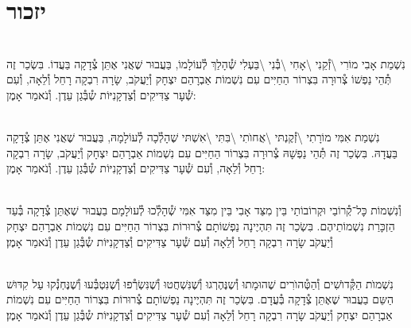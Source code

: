 \documentclass[twoside, openany, parskip=half, 11pt]{book}
\begin{document}
\vfill
{}


\sepline



\chapter[יזכור]{ יזכור }

 

\\
נִשְׁמַת אָבִי מוֹרִי \textbackslash זְ֯קֵנִי \textbackslash אָחִי \textbackslash בְּ֯נִי \textbackslash בַּעְלִי  שְׁ֯הָלַךְ לְ֯עוֹלָמוֹ, בַּעֲבוּר שֶׁאֲנִי אֶתֵּן צְ֯דָקָה בַּעֲדוֹ. בִּשְׂכַר זֶה תְּ֯הֵי נַפְשׁוֹ צְ֯רוּרָה בִּצְרוֹר הַחַיִּים עִם נִשְׁמוֹת אַבְרָהַם יִצְחָק וְ֯יַעֲקֹב, שָׂרָה רִבְקָה רָחֵל וְ֯לֵאָה, וְ֯עִם שְׁ֯עָר צַדִּיקִים וְ֯צַדְקָנִיּוֹת שְ֯בְּ֯גַן עֵדֶן. וְ֯נֹאמַר אָמֶן:

\\
נִשְׁמַת אִמִּי מוֹרָתִי \textbackslash זְ֯קֶנְתּי \textbackslash אֲחוׂתִי \textbackslash בִּתִּי \textbackslash אִשְׁתּי
שֶׁהָלְ֯כָה לְ֯עוֹלָמָהּ, בַּעֲבוּר שֶׁאֲנִי אֶתֵּן צְ֯דָקָה בַּעֲדָהּ. בִּשְׂכַר זֶה תְּ֯הֵי נַפְשָׁהּ צְ֯רוּרָה בִּצְרוֹר הַחַיִּים עִם נִשְׁמוֹת אַבְרָהַם יִצְחָק וְ֯יַעֲקֹב, שָׂרָה רִבְקָה רָחֵל וְ֯לֵאָה, וְ֯עִם שְׁ֯עָר צַדִּיקִים וְ֯צַדְקָנִיּוֹת שְ֯בְּ֯גַן עֵדֶן. וְ֯נֹאמַר אָמֶן:

 \\
וְ֯נִשְׁמוֹת כׇּל־קְ֯רוֹבַי וּקְרוֹבוֹתַי בֵּין מִצַּד אָבִי בֵּין מִצַּד אִמִּי
שְׁ֯הָלְ֯כוּ לְ֯עוׂלָמָם
בַעֲבוּר שֶׁאֶתֵּן צְ֯דָקָה בְּ֯עַד הַזְכָּרַת נִשְׁמוֹתֵיהֶם. בִּשְׂכַר זֶה תִּהְיֶינָה נַפְשׁוֹתָם צְ֯רוּרוֹת בִּצְרוֹר הַחַיִּים עִם נִשְׁמוֹת אַבְרָהַם יִצְחָק וְ֯יַעֲקֹב שָׂרָה רִבְקָה רָחֵל וְ֯לֵאָה וְ֯עִם שְׁ֯עָר צַדִּיקִים וְ֯צַדְקָנִיּוֹת שְ֯בְּ֯גַן עֵדֶן וְ֯נֹאמַר אָמֶן׃



\\
נִשְׁמוׂת הַקְּ֯דוׂשִׁים וְ֯הַטְּ֯הוׂרִים
שֶׁהוּמָתוּ וְ֯שֶנֶּהֶרְגוּ וְ֯שֶׁנִּשְׁחֲטוּ וְ֯שֶׁנִּשְׂרְ֯פוּ וְ֯שֶׁנִּטְבְּ֯עוּ וְ֯שֶׁנֶּחְנְ֯קוּ עַל קִדּוּשׁ הַשֵּם בַעֲבוּר שֶׁאֶתֵּן צְ֯דָקָה בְּ֯עֲדָם. בִּשְׂכַר זֶה תִּהְיֶינָה נַפְשׁוֹתָם צְ֯רוּרוֹת בִּצְרוֹר הַחַיִּים עִם נִשְׁמוֹת אַבְרָהַם יִצְחָק וְ֯יַעֲקֹב שָׂרָה רִבְקָה רָחֵל וְ֯לֵאָה וְ֯עִם שְׁ֯עָר צַדִּיקִים וְ֯צַדְקָנִיּוֹת שְ֯בְּ֯גַן עֵדֶן וְ֯נֹאמַר אָמֶן׃
%
\end{document}
